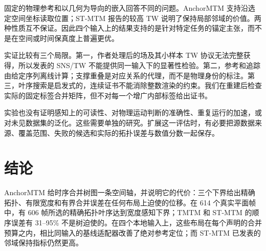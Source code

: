 \documentclass[fontset=none,zihao=5,a4paper]{ctexart}
\begin{document}
固定的物理参考和以几何为导向的嵌入回答不同的问题。AnchorMTM 支持沿选定空间坐标读取位置；ST-MTM 报告的较高 TW 说明了保持局部邻域的价值。两种性质互不保证。因此四个输入上的结果支持的是针对特定任务的锚定主张，而不是在空间或时间保真度上普遍更优。

实证比较有三个局限。第一，作者处理后的场及其小样本 TW 协议无法完整获得，所以发表的 SNS/TW 不能提供同一输入下的显著性检验。第二，参考和追踪由给定序列离线计算；支撑重叠是对应关系的代理，而不是物理身份的标注。第三，叶序搜索是启发式的，连续证书不能消除整数渲染的约束。我们在重建后检查实际的固定标签合并矩阵，但不对每一个增广内部标签给出证书。

实验也没有证明感知上的可读性、对物理运动判断的准确性、重复运行的加速，或对未见数据集的泛化。这些需要单独的研究。扩展这一评估时，有必要把源数据来源、覆盖范围、失败的候选和实际的拓扑误差与数值分数一起保存。

\section{结论}
AnchorMTM 给时序合并树图一条空间轴，并说明它的代价：三个下界给出精确拓扑、有限宽度和有界合并误差在任何布局上迫使的位移。在 614 个真实平面帧中，有 606 帧所选的精确拓扑叶序达到宽度感知下界；TMTM 和 ST-MTM 的顺序误差有 31--95\% 不是树迫使的。在四个本地输入上，这些布局在每个声明的合并预算之内，相比同输入的基线适配器改善了绝对参考定位；而 ST-MTM 已发表的邻域保持指标仍然更高。



\end{document}
